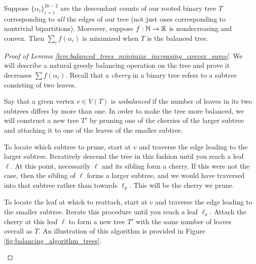 \begin{subappendices}
\begin{lemma}
\label{lem:balanced_trees_minimize_increasing_convex_sums}
 Suppose $\{\alpha_{i}\}_{i=1}^{2k-2}$ are the descendant counts of our rooted binary tree $T$ corresponding to \textit{all} the edges of our tree (not just ones corresponding to nontrivial bipartitions). Moreover, suppose $f: \mathbb{N} \to \mathbb{R}$ is nondecreasing and convex. Then $\sum_i f(\alpha_{i})$ is minimized when $T$ is the balanced tree.
\end{lemma}

\begin{proof}[Proof of Lemma \ref{lem:balanced_trees_minimize_increasing_convex_sums}]
\noindent We will describe a natural greedy balancing operation on the tree and prove it decreases $\sum f(\alpha_i)$. Recall that a \textit{cherry} in a binary tree refers to a subtree consisting of two leaves.

Say that a given vertex $v \in V(T)$ is \textit{unbalanced} if the number of leaves in its two subtrees differs by more than one. In order to make the tree more balanced, we will construct a new tree $T'$ by pruning one of the cherries of the larger subtree and attaching it to one of the leaves of the smaller subtree.

To locate which subtree to prune, start at $v$ and traverse the edge leading to the larger subtree. Iteratively descend the tree in this fashion until you reach a leaf $\ell$. At this point, necessarily $\ell$ and its sibling form a cherry. If this were not the case, then the sibling of $\ell$ forms a larger subtree, and we would have traversed into that subtree rather than towards $\ell_p$. This will be the cherry we prune.

To locate the leaf at which to reattach, start at $v$ and traverse the edge leading to the smaller subtree. Iterate this procedure until you reach a leaf $\ell_a$. Attach the cherry at this leaf $\ell$ to form a new tree $T'$ with the same number of leaves overall as $T$. An illustration of this algorithm is provided in Figure \ref{fig:balancing_algorithm_trees}.

\begin{figure}[h]
\centering
\begin{minipage}{0.48\textwidth}
\centering
\begin{tikzpicture}[scale=0.7]


\end{tikzpicture}
\end{minipage}
\end{figure}
\end{proof}
\end{subappendices}
